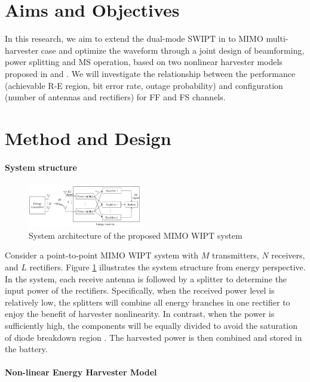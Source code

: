 \documentclass[conference]{IEEEtran}
\begin{document}
\section{Aims and Objectives}
In this research, we aim to extend the dual-mode SWIPT in \cite{Park2018} to MIMO multi-harvester case and optimize the waveform through a joint design of beamforming, power splitting and MS operation, based on two nonlinear harvester models proposed in \cite{Boshkovska2015} and \cite{Clerckx2016}. We will investigate the relationship between the performance (achievable R-E region, bit error rate, outage probability) and configuration (number of antennas and rectifiers) for FF and FS channels.

\section{Method and Design}

\paragraph{System structure}

\begin{figure}
  \centering
    \includegraphics[width=0.45\textwidth]{system_architecture}
  \caption{System architecture of the proposed MIMO WIPT system \cite{Ma2019}}
  \label{fig:system_architecture}
\end{figure}

Consider a point-to-point MIMO WIPT system with $M$ transmitters, $N$ receivers, and $L$ rectifiers. Figure \ref{fig:system_architecture} illustrates the system structure from energy perspective. In the system, each receive antenna is followed by a splitter to determine the input power of the rectifiers. Specifically, when the received power level is relatively low, the splitters will combine all energy branches in one rectifier to enjoy the benefit of harvester nonlinearity. In contrast, when the power is sufficiently high, the components will be equally divided to avoid the saturation of diode breakdown region \cite{Clerckx2019}. The harvested power is then combined and stored in the battery.

\paragraph{Non-linear Energy Harvester Model}
\end{document}
